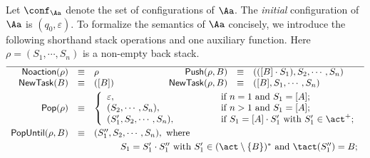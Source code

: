 {Let $\conf_\Aa$ denote the set of configurations of $\Aa$. The \emph{initial} configuration of $\Aa$ is $(q_0, \varepsilon)$. To formalize the semantics of $\Aa$ concisely, we introduce the following shorthand stack operations and one auxiliary function. Here $\rho=(S_1,\cdots, S_n)$ is a non-empty back stack.
\[
\begin{array}{rclrclrcl}
\hline
    {\sf Noaction}(\rho ) & \equiv & \rho & ~~~~~~~~~~~~ ~~~~~~~~     {\sf Push}(\rho,B) & \equiv & (([B] \cdot S_1),S_2, \cdots, S_n)   \\\smallskip
    {\sf NewTask}(B)&  \equiv & ([B]) & {\sf NewTask}(\rho,B ) & \equiv &([B],S_1,\cdots, S_n) \\  \smallskip
    {\sf Pop}(\rho ) & \equiv & \multicolumn{4}{l}{ \left\{ \begin{array}{ll}
                                                     \varepsilon, ~~~~~~~~~ ~~~~~~~~&\mbox{if}~n=1~\mbox{and}~S_1=[A]; \\
                                                     (S_2,\cdots, S_n), ~~~~~~~~~ ~~~~~~~~&\mbox{if}~n >1~\mbox{and}~S_1=[A]; \\
                                                     (S_1',S_2,\cdots, S_n), & \mbox{if}~S_1=[A] \cdot S_1'~\mbox{with}~S_1' \in \act^+;
                                                          \end{array} \right.} \\\smallskip
    {\sf PopUntil}(\rho,B) & \equiv & \multicolumn{4}{l}{ (S_1'',S_2,\cdots, S_n),~\mbox{where}~} \\
    & & \multicolumn{4}{l}{\hspace{1cm}S_1=S'_1 \cdot S''_1~\mbox{with}~S'_1 \in (\act \setminus \{B\})^*~\mbox{and}~\tact(S''_1)=B;}\\ \smallskip


\end{array}\]}
